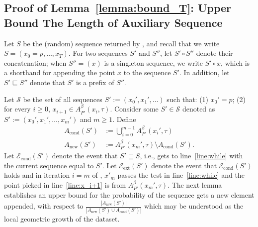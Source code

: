 \documentclass[11pt,letterpaper]{article}
\theoremstyle{plain}
\theoremstyle{definition}
\theoremstyle{remark}
\newcommand{\Econd}{\ensuremath{\mathcal{E}_{\mathrm{cond}}}\xspace}
\newcommand{\Eextend}{\ensuremath{\mathcal{E}_{\mathrm{ext}}}\xspace}
\newcommand{\Acond}{\ensuremath{A_{\mathrm{cond}}}\xspace}
\newcommand{\Anew}{\ensuremath{A_{\mathrm{new}}}\xspace}
\begin{document}
\subsection{Proof of Lemma~\ref{lemma:bound_T}: Upper Bound The Length of Auxiliary Sequence}
 \label{sec:proof_bound_T}

        Let $S$ be the (random) sequence returned by ,
        and recall that we write $S =(x_0 = p, \ldots, x_T)$.
        For two sequences $S'$ and $S''$, let $S'\circ S''$ denote their concatenation; when $S'' = (x) $ is a singleton sequence, we write $S'\circ x$, which is a shorthand for appending the point $x$ to the sequence $S'$.     
        In addition, let $S'\sqsubseteq S''$ denote that $S'$ is a prefix of $S''$. 
        
        Let $\mathcal{S}$ be the set of all sequences $S':=(x_{0}', x_{1}', \ldots )$ such that: (1) $x_{0}' = p$; (2) for every $i\geq 0$, $x_{i+1}\in A_{P'}^{\beta}(x_{i}, \tau)$.  
        Consider some $S'\in \mathcal{S}$ denoted as $S' := (x_{0}', x_{1}', \ldots, x_{m}')$ and $m\geq 1$.  
        Define 
        \begin{align}
            \label{eqn:Acond_Anew}
            \Acond(S')&:= \bigcup_{i=0}^{m-1}A_{P'}^{\beta}(x_{i}', \tau)\nonumber\\ 
            \Anew(S')&:= A_{P'}^{\beta}(x_{m}', \tau)\setminus \Acond(S'). 
        \end{align} 
        Let $\Econd(S')$ denote the event that $S'\sqsubseteq S$, i.e.,  gets to line~\ref{line:while} with the current sequence equal to $S'$. 
        Let $\Eextend(S')$ denote the event that $\Econd(S')$ holds and in iteration $i=m$ of ,  $x'_{m}$ passes the test in line~\ref{line:while} and the point picked in line~\ref{line:x_i+1} is from $A_{P'}^{\beta}(x_{m}', \tau)$.  
        The next lemma establishes an upper bound for the probability of the sequence gets a new element appended,
        with respect to  $\frac{|\Anew(S')|}{|\Anew(S')\cup \Acond(S')|}$
        which may be understood as the local geometric growth of the dataset.  
\end{document}
